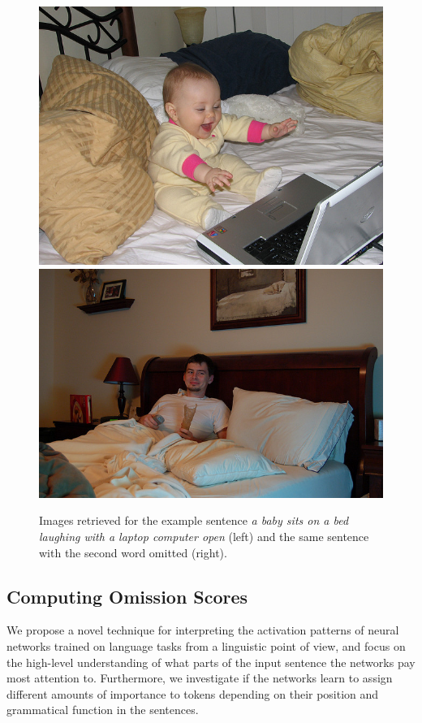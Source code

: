 \begin{figure}[t]
  \centering
  \includegraphics[scale=0.25]{chapters/COLI/85826.jpg}
  \includegraphics[scale=0.25]{chapters/COLI/60596.jpg}
  \caption{Images retrieved for the example sentence {\it a baby sits
      on a bed laughing with a laptop computer open} (left) and the
    same sentence with the second word omitted (right).}
  \label{fig:omissionexpic}
\end{figure}



\subsection{Computing Omission Scores}
\label{sec:computeomission}

We propose a novel technique for interpreting the
activation patterns of neural networks trained on language tasks
from a linguistic point of view, and focus
on the high-level understanding of what parts of the input sentence the networks
pay most attention to. Furthermore, we investigate if the networks
learn to assign different amounts of importance to tokens depending
on their position and grammatical function in the sentences.\label{edit:whyposdep}

